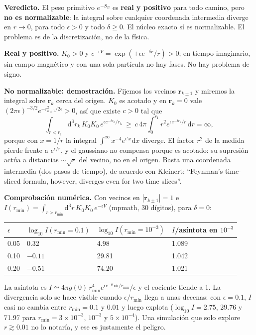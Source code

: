 \documentclass[11pt]{article}
\newcommand{\dd}{\mathrm{d}}
\begin{document}
\textbf{Veredicto.} El peso primitivo $e^{-S_E}$ es \textbf{real y positivo} para todo camino, pero \textbf{no es normalizable}: la integral sobre cualquier coordenada intermedia diverge en $r\to0$, para todo $\epsilon>0$ y todo $\delta\ge0$. El núcleo exacto sí es normalizable. El problema es de la discretización, no de la física.

\textbf{Real y positivo.} $K_0>0$ y $e^{-\epsilon V}=\exp(+\epsilon e^{-\delta r}/r)>0$; en tiempo imaginario, sin campo magnético y con una sola partícula no hay fases. No hay problema de signo.

\textbf{No normalizable: demostración.} Fijemos los vecinos $\mathbf r_{k\pm1}$ y miremos la integral sobre $\mathbf r_k$ cerca del origen. $K_0$ es acotado y en $\mathbf r_k=0$ vale $(2\pi\epsilon)^{-3/2}e^{-r_{k\pm1}^2/2\epsilon}>0$, así que existe $c>0$ tal que
\[
\int_{r<r_1}\dd^3r_k\,K_0K_0\,e^{\epsilon e^{-\delta r_k}/r_k}\ \ge\ c\,4\pi\int_0^{r_1}r^2e^{\epsilon e^{-\delta r_1}/r}\,\dd r=\infty,
\]
porque con $x=1/r$ la integral $\int^\infty x^{-4}e^{\epsilon'x}\dd x$ diverge. El factor $r^2$ de la medida pierde frente a $e^{\epsilon/r}$, y el gaussiano no compensa porque es acotado: su supresión actúa a distancias $\sim\sqrt\epsilon$ del vecino, no en el origen. Basta una coordenada intermedia (dos pasos de tiempo), de acuerdo con Kleinert: ``Feynman's time-sliced formula, however, diverges even for two time slices''.

\textbf{Comprobación numérica.} Con vecinos en $|\mathbf r_{k\pm1}|=1$ e $I(r_{\min})=\int_{r>r_{\min}}\dd^3r\,K_0K_0\,e^{-\epsilon V}$ (mpmath, 30 dígitos), para $\delta=0$:

\begin{table}[H]
\centering
\small
\begin{tabular}{@{}llll@{}}
\toprule
$\epsilon$ & $\log_{10}I(r_{\min}=0.1)$ & $\log_{10}I(r_{\min}=10^{-3})$ & $I$/asíntota en $10^{-3}$\\
\midrule
0.05 & 0.32 & 4.98 & 1.089\\
0.10 & $-0.11$ & 29.81 & 1.042\\
0.20 & $-0.51$ & 74.20 & 1.021\\
\bottomrule
\end{tabular}
\end{table}

La asíntota es $I\simeq4\pi g(0)\,r_{\min}^4e^{\epsilon e^{-\delta r_{\min}}/r_{\min}}/\epsilon$ y el cociente tiende a 1. La divergencia solo se hace visible cuando $\epsilon/r_{\min}$ llega a unas decenas: con $\epsilon=0.1$, $I$ casi no cambia entre $r_{\min}=0.1$ y $0.01$ y luego explota ($\log_{10}I=2.75$, 29.76 y 71.97 para $r_{\min}=3\times10^{-3}$, $10^{-3}$ y $5\times10^{-4}$). Una simulación que solo explore $r\gtrsim0.01$ no lo notaría, y ese es justamente el peligro.
\end{document}
